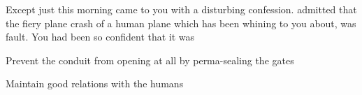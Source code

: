 \documentclass[char]{elementals}
\begin{document}
Except just this morning \cNaturalist{} came to you with a disturbing confession.  admitted that the fiery plane crash of a human plane which \cLeader{} has been whining to you about, was \cNaturalist{\their} fault. You had been so confident that it was 

\begin{itemz}[Goals]
	\item  Prevent the conduit from opening at all by perma-sealing the gates
	\item  Maintain good relations with the humans
\end{itemz}

\begin{contacts}
	\contact{\cLeader{}}
	
\end{contacts} 
\end{document}
